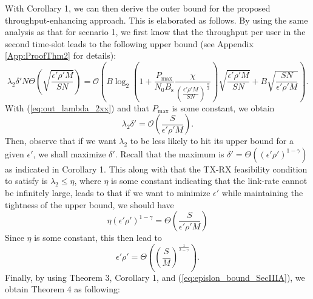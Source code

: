 \documentclass[journal,draftclsnofoot,onecolumn,12pt,twoside]{IEEEtran}
\begin{document}
With Corollary 1, we can then derive the outer bound for the proposed throughput-enhancing approach. This is elaborated as follows. By using the same analysis as that for scenario 1, we first know that the throughput per user in the second time-slot leads to the following upper bound (see Appendix \ref{App:ProofThm2} for details):
\begin{equation}\label{eq:out_lambda_2xx}
\lambda_2\delta' N\Theta\left(\sqrt{\frac{\epsilon'\rho'M}{SN}}\right)=\mathcal{O}\left(B\log_2\left(1+\frac{P_{\text{max}}}{N_0B_{\text{s}}}\frac{\chi}{\left(\frac{\epsilon'\rho'M}{SN}\right)^\frac{\alpha}{2}}\right)\sqrt{\frac{\epsilon'\rho'M}{SN}}+B\sqrt{\frac{SN}{\epsilon'\rho'M}}\right).
\end{equation} 
With (\ref{eq:out_lambda_2xx}) and that $P_{\text{max}}$ is some constant, we obtain
\begin{equation}\label{eq:delta_bound_SecIIIA_2}
\lambda_2\delta'=\mathcal{O}\left(\frac{S}{\epsilon'\rho'M}\right).
\end{equation}
Then, observe that if we want $\lambda_2$ to be less likely to hit its upper bound for a given $\epsilon'$, we shall maximize $\delta'$. Recall that the maximum is $\delta'=\Theta\left((\epsilon'\rho')^{1-\gamma}\right)$ as indicated in Corollary 1. This along with that the TX-RX feasibility condition to satisfy is $\lambda_2\leq \eta$, where $\eta$ is some constant indicating that the link-rate cannot be infinitely large, leads to that if we want to minimize $\epsilon'$ while maintaining the tightness of the upper bound, we should have
\begin{equation}
\eta(\epsilon'\rho')^{1-\gamma}=\Theta\left(\frac{S}{\epsilon'\rho'M}\right)
\end{equation}
Since $\eta$ is some constant, this then lead to
\begin{equation}\label{eq:epislon_bound_SecIIIA}
\epsilon'\rho'=\Theta\left(\left(\frac{S}{M}\right)^{\frac{1}{2-\gamma}}\right).
\end{equation}
Finally, by using Theorem 3, Corollary 1, and (\ref{eq:epislon_bound_SecIIIA}), we obtain Theorem 4 as following:
\end{document}
